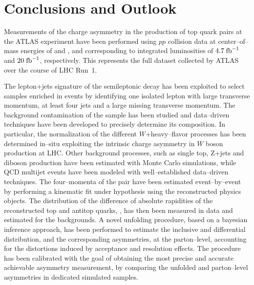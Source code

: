 \chapter{Conclusions and Outlook}
\label{sec:conclusion}

Measurements of the charge asymmetry in the production of top quark pairs at
the ATLAS experiment have been performed using $pp$ collision data at 
center--of--mass energies of \seventev{} and \eighttev{}, and corresponding
to integrated luminosities of $4.7 \; \mathrm{fb}^{-1}{}$ and $20 \; \mathrm{fb}^{-1}{}$, respectively.
This represents the full dataset collected by ATLAS over the course of
LHC \mbox{Run 1}.

The lepton+jets signature of the semileptonic \ttbar{} decay has been
exploited to select samples enriched in \ttbar{} events by identifying
one isolated lepton with large transverse momentum,
at least four jets and a large missing transverse momentum.
The background contamination of the sample has been studied and
data--driven techniques have been developed to precisely determine its
composition. In particular, the normalization of the different
$W$+heavy--flavor processes has been determined in--situ exploiting
the intrinsic charge asymmetry in $W$ boson production at LHC. 
Other background processes, such
as single top, Z+jets and diboson production have been estimated with
Monte Carlo simulations, while QCD multijet events have been modeled
with well--established data--driven techniques.
The four--momenta of the \ttbar{} pair have been estimated
event--by--event by performing a kinematic fit under \ttbar{} hypothesis 
using the reconstructed physics objects. 
The distribution of the difference of absolute
rapidities of the reconstructed top and antitop quarks, \dy{}, has then been
measured in data and estimated for the backgrounds.
A novel unfolding procedure, based on a bayesian inference approach, has
been performed to estimate the inclusive and differential \dy{}
distribution, and the corresponding asymmetries, at the parton--level,
accounting for the distortions induced by acceptance and
resolution effects.
The procedure has been calibrated with the goal of obtaining the most
precise and accurate achievable asymmetry measurement, by comparing the
unfolded and parton--level asymmetries in dedicated simulated samples.

